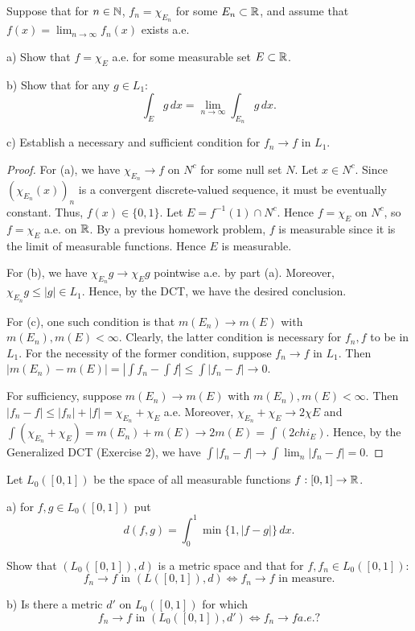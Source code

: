 \documentclass{article}
\begin{document}
 Suppose that for $n \in \mathbb{N}$, $f_n = \chi_{E_n}$ for some $E_n \subset \mathbb{R}$, and assume that $f(x) = \lim_{n \to \infty} f_n(x)$ exists a.e.

a) Show that $f = \chi_E$ a.e. for some measurable set $E \subset \mathbb{R}$.

b) Show that for any $g \in L_1$:
$$ \int_E g \, dx = \lim_{n \to \infty} \int_{E_n} g \, dx.$$

c) Establish a necessary and sufficient condition for $f_n \to f$ in $L_1$.

\begin{proof}
For (a), we have $\chi_{E_n} \to f$ on $N^c$ for some null set $N$.  Let $x \in N^c$. Since $(\chi_{E_n}(x))_n$ is a convergent discrete-valued sequence, it must be eventually constant.  Thus, $f(x) \in \{0,1\}$.  Let $E = f^{-1}(1) \cap N^c$.  Hence $f = \chi_E$ on $N^c$, so $f = \chi_E$ a.e. on $\mathbb{R}$. By a previous homework problem, $f$ is measurable since it is the limit of measurable functions.  Hence $E$ is measurable.  

For (b), we have $\chi_{E_n} g \to \chi_E g$ pointwise a.e. by part (a).  Moreover, $\chi_{E_n} g \le |g| \in L_1$. Hence, by the DCT, we have the desired conclusion.

For (c), one such condition is that $m(E_n) \to m(E)$ with $m(E_n), m(E) < \infty$.  Clearly, the latter condition is necessary for $f_n, f$ to be in $L_1$.  For the necessity of the former condition, suppose $f_n \to f$ in $L_1$.  Then $|m(E_n) - m(E)| = |\int f_n - \int f | \le \int |f_n - f| \to 0$.

For sufficiency, suppose $m(E_n) \to m(E)$ with $m(E_n), m(E) < \infty$.    Then $|f_n - f| \le |f_n| + |f| = \chi_{E_n} + \chi_E$ a.e.  Moreover, $\chi_{E_n} + \chi_E \to 2 \chi E$ and $\int (\chi_{E_n} + \chi_E) = m(E_n) + m(E) \to 2 m(E) = \int (2 chi_E)$.  Hence, by the Generalized DCT (Exercise 2), we have
$\int |f_n - f| \to \int \lim_n |f_n - f| = 0$.
\end{proof}

 Let $L_0([0,1])$ be the space of all measurable functions $f : [0,1] \to \mathbb{R}$.

a) for $f,g \in L_0([0,1])$ put
$$d(f, g) = \int_0^1 \min\{1, |f - g|\} \, dx.$$

Show that $(L_0([0,1]), d)$ is a metric space and that for $f, f_n \in L_0([0,1])$:
$$ f_n \to f \text{ in } (L([0,1]), d) \iff f_n \to f \text { in measure.}$$

b) Is there a metric $d'$ on $L_0([0,1])$ for which 
$$f_n \to f \text{ in } (L_0([0,1]), d') \iff f_n \to f a.e. ? $$
\end{document}

